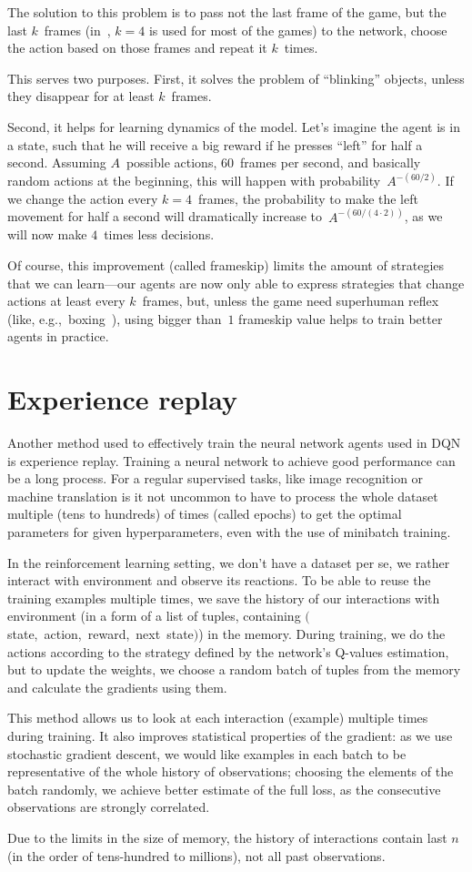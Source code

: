 The solution to this problem is to pass not the last frame of the game, but the last $k$~frames (in~\cite{nips-dqn}, $k=4$ is used for most of the games) to the network, choose the action based on those frames and repeat it $k$~times.

This serves two purposes. First, it solves the problem of ``blinking'' objects, unless they disappear for at least $k$~frames.

Second, it helps for learning dynamics of the model. Let's imagine the agent is in a state, such that he will receive a big reward if he presses ``left'' for half a second. Assuming $A$~possible actions, $60$~frames per second, and basically random actions at the beginning, this will happen with probability~$A^{-(60 / 2)}$. If we change the action every $k=4$~frames, the probability to make the left movement for half a second will dramatically increase to~$A^{-(60/(4 \cdot 2))}$, as we will now make $4$~times less decisions.

Of course, this improvement (called frameskip) limits the amount of strategies that we can learn---our agents are now only able to express strategies that change actions at least every $k$~frames, but, unless the game need superhuman reflex (like, e.g.,~boxing~\cite{boxing}), using bigger than~$1$ frameskip value helps to train better agents in practice.

\section{Experience replay}\label{experience-replay}
Another method used to effectively train the neural network agents used in DQN is experience replay. Training a neural network to achieve good performance can be a long process. For a regular supervised tasks, like image recognition or machine translation is it not uncommon to have to process the whole dataset multiple (tens to hundreds) of times (called epochs) to get the optimal parameters for given hyperparameters, even with the use of minibatch training.

In the reinforcement learning setting, we don't have a dataset per se, we rather interact with environment and observe its reactions. To be able to reuse the training examples multiple times, we save the history of our interactions with environment (in a form of a list of tuples, containing $($state,~action,~reward,~next~state$)$) in the memory. During training, we do the actions according to the strategy defined by the network's Q-values estimation, but to update the weights, we choose a random batch of tuples from the memory and calculate the gradients using them.

This method allows us to look at each interaction (example) multiple times during training. It also improves statistical properties of the gradient: as we use stochastic gradient descent, we would like examples in each batch to be representative of the whole history of observations; choosing the elements of the batch randomly, we achieve better estimate of the full loss, as the consecutive observations are strongly correlated.

Due to the limits in the size of memory, the history of interactions contain last $n$ (in the order of tens-hundred to millions), not all past observations.
